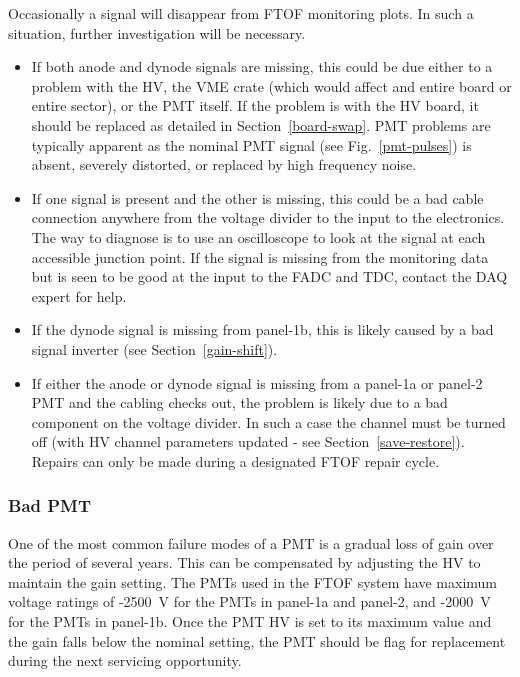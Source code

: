 \documentclass[letterpaper,10pt]{article}
\begin{document}
Occasionally a signal will disappear from FTOF monitoring plots. In such a situation, further
investigation will be necessary. 

\begin{itemize}
\item If both anode and dynode signals are missing, this could be due either to a problem with the HV, 
the VME crate (which would affect and entire board or entire sector), or the PMT itself. If the problem
is with the HV board, it should be replaced as detailed in Section~\ref{board-swap}. PMT problems are
typically apparent as the nominal PMT signal (see Fig.~\ref{pmt-pulses}) is absent, severely distorted, 
or replaced by high frequency noise.
\item If one signal is present and the other is missing, this could be a bad cable connection anywhere
from the voltage divider to the input to the electronics. The way to diagnose is to use an
oscilloscope to look at the signal at each accessible junction point. If the signal is missing from the
monitoring data but is seen to be good at the input to the FADC and TDC, contact the DAQ expert for
help.
\item If the dynode signal is missing from panel-1b, this is likely caused by a bad signal inverter
(see Section~\ref{gain-shift}).
\item If either the anode or dynode signal is missing from a panel-1a or panel-2 PMT and the cabling
checks out, the problem is likely due to a bad component on the voltage divider. In such a case the
channel must be turned off (with HV channel parameters updated - see Section~\ref{save-restore}). 
Repairs can only be made during a designated FTOF repair cycle.
\end{itemize}

\subsubsection{Bad PMT}
\label{bad-pmt}

One of the most common failure modes of a PMT is a gradual loss of gain over the period of
several years. This can be compensated by adjusting the HV to maintain the gain setting. The
PMTs used in the FTOF system have maximum voltage ratings of -2500~V for the PMTs in panel-1a
and panel-2, and -2000~V for the PMTs in panel-1b. Once the PMT HV is set to its maximum value
and the gain falls below the nominal setting, the PMT should be flag for replacement during
the next servicing opportunity.
\end{document}
